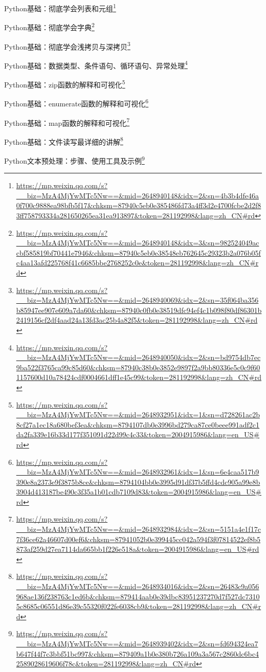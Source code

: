 \documentclass[]{ctexbook}
\renewcommand{\href}[2]{#2\footnote{\url{#1}}}
\begin{document}
\href{https://mp.weixin.qq.com/s?__biz=MzA4MjYwMTc5Nw==\&mid=2648940148\&idx=2\&sn=4b3b4dfe46a0f700c9888ea98bfb5f17\&chksm=87940c5eb0e385486fd73a4ff3d2e4700fcbe2d2f83ff758793334a281650265ea31ea913897\&token=281192998\&lang=zh_CN\#rd}{Python基础：彻底学会列表和元组}

\href{https://mp.weixin.qq.com/s?__biz=MzA4MjYwMTc5Nw==\&mid=2648940148\&idx=3\&sn=982524049accbf585819bf70441e7946\&chksm=87940c5eb0e38548eb762645c29323b2a076b05fc4aa13afd225768f41c6685bbe2768252c0e\&token=281192998\&lang=zh_CN\#rd}{Python基础：彻底学会字典}

\href{https://mp.weixin.qq.com/s?__biz=MzA4MjYwMTc5Nw==\&mid=2648940069\&idx=2\&sn=35f064ba356b85947ee907e609a7da60\&chksm=87940c0fb0e38519dfc94ef4c1b098f80df86301b2419156cf2df4aad24a13fd3ac25b4a82f5\&token=281192998\&lang=zh_CN\#rd}{Python基础：彻底学会浅拷贝与深拷贝}

\href{https://mp.weixin.qq.com/s?__biz=MzA4MjYwMTc5Nw==\&mid=2648940050\&idx=2\&sn=bd9754db7ec9ba522f3765ca99c85d60\&chksm=87940c38b0e3852e9897f2a9bb80336e5c0c9f601157600d10a78424cdf0004661dff1e45c99\&token=281192998\&lang=zh_CN\#rd}{Python基础：数据类型、条件语句、循环语句、异常处理}

\href{https://mp.weixin.qq.com/s?__biz=MzA4MjYwMTc5Nw==\&mid=2648932951\&idx=1\&sn=d728261ac2b8cf27a1ec18a680bef3ea\&chksm=8794107db0e3996bd279ca87ce0beee991adf2c1da2fa339e16b33d177f351091d22d99c4c33\&token=2004915986\&lang=en_US\#rd}{Python基础：zip函数的解释和可视化}

\href{https://mp.weixin.qq.com/s?__biz=MzA4MjYwMTc5Nw==\&mid=2648932961\&idx=1\&sn=6e4caa517b9390e8a2373e9f3875b8ce\&chksm=8794104bb0e3995d91df37b5ffd4cdc905a99e8b3904d413187be490c3f35a1b01cdb7109d83\&token=2004915986\&lang=en_US\#rd}{Python基础：enumerate函数的解释和可视化}

\href{https://mp.weixin.qq.com/s?__biz=MzA4MjYwMTc5Nw==\&mid=2648932984\&idx=2\&sn=5151a4e1f17c7f36ce62a46607d00ef6\&chksm=87941052b0e399445cc042a594f3f07814522ef8b5873af259d27ea7114da665bb1f226e518a\&token=2004915986\&lang=en_US\#rd}{Python基础：map函数的解释和可视化}

\href{https://mp.weixin.qq.com/s?__biz=MzA4MjYwMTc5Nw==\&mid=2648934016\&idx=2\&sn=26483c9a056968ae136f238763c1ed6b\&chksm=879414aab0e39dbc83951237270d7f527dc73105c8685c06551d86e39c55320f022fe6038cb9\&token=281192998\&lang=zh_CN\#rd}{Python基础：文件读写最详细的讲解}

\href{https://mp.weixin.qq.com/s?__biz=MzA4MjYwMTc5Nw==\&mid=2648939402\&idx=2\&sn=fd694324ea7b647f44f7c3bbf51bc997\&chksm=879409a1b0e380b726a109a3a567c2860dc6bc42589028619606f78c\&token=281192998\&lang=zh_CN\#rd}{Python文本预处理：步骤、使用工具及示例}
\end{document}
